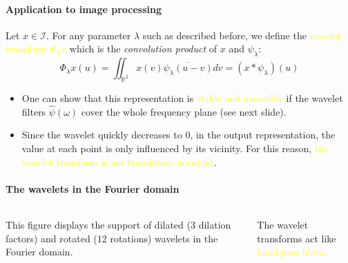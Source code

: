 \documentclass[10pt]{beamer}
\newcommand{\mathR}{\mathbb{R}}
\newcommand{\MI}{{\mathcal I}}
\newcommand{\col}{\textcolor{yellow}}
\begin{document}
\begin{darkframes}
    
    \begin{frame}[label=wavelet_trsf]{\subsecname}
    \framesubtitle{Application to image processing}
    Let $x \in \MI$. For any parameter $\lambda$ such as described before, we define the \col{wavelet transform $\Phi_\lambda x$} which is the \emph{convolution product} of $x$ and $\psi_\lambda$:
    $$\Phi_\lambda x (u) = \iint_{\mathR^2} x(v) \overline{\psi_\lambda(u-v)} dv = (x \ast \psi_\lambda)(u)$$
    \begin{itemize}
        \item One can show that this representation is \col{stable and invertible} if the wavelet filters $\widehat{\psi}(\omega)$ cover the whole frequency plane (see next slide).
        \item Since the wavelet quickly decreases to $0$, in the output representation, the value at each point is only influenced by its vicinity. For this reason, \col{the wavelet transform is not translation-invariant}.
    \end{itemize}
    \end{frame}
    
    \begin{frame}[label=fourier]{\subsecname}
    \framesubtitle{The wavelets in the Fourier domain} 
    \begin{columns}
            This figure displays the support of dilated (3 dilation factors) and rotated (12 rotations) wavelets in the Fourier domain.
            
            The wavelet transforms act like \col{band-pass filters.}
            

\end{columns}
\end{frame}
\end{darkframes}
\end{document}
